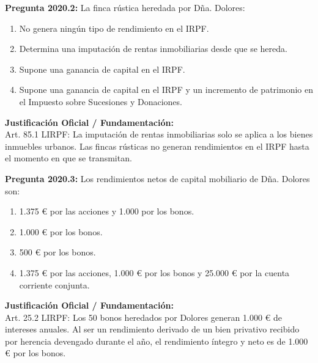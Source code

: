 \documentclass[11pt,a4paper,openany]{article}
\begin{document}
\noindent\textbf{\sffamily Pregunta 2020.2:} La finca rústica heredada por Dña. Dolores:\\[0.15cm]
\begin{enumerate}[label=\textbf{\alph*)},leftmargin=1.8em,itemsep=1.5pt,topsep=2pt,partopsep=0pt,parsep=0pt]
    \item No genera ningún tipo de rendimiento en el IRPF.
    \item Determina una imputación de rentas inmobiliarias desde que se hereda.
    \item Supone una ganancia de capital en el IRPF.
    \item Supone una ganancia de capital en el IRPF y un incremento de patrimonio en el Impuesto sobre Sucesiones y Donaciones.
\end{enumerate}
\begin{solucionBox}
\textbf{Justificación Oficial / Fundamentación:}\\[0.1cm]
Art. 85.1 LIRPF: La imputación de rentas inmobiliarias solo se aplica a los bienes inmuebles urbanos. Las fincas rústicas no generan rendimientos en el IRPF hasta el momento en que se transmitan.
\end{solucionBox}
\vspace{0.35cm}

\noindent\textbf{\sffamily Pregunta 2020.3:} Los rendimientos netos de capital mobiliario de Dña. Dolores son:\\[0.15cm]
\begin{enumerate}[label=\textbf{\alph*)},leftmargin=1.8em,itemsep=1.5pt,topsep=2pt,partopsep=0pt,parsep=0pt]
    \item 1.375 \euro{} por las acciones y 1.000 por los bonos.
    \item 1.000 \euro{} por los bonos.
    \item 500 \euro{} por los bonos.
    \item 1.375 \euro{} por las acciones, 1.000 \euro{} por los bonos y 25.000 \euro{} por la cuenta corriente conjunta.
\end{enumerate}
\begin{solucionBox}
\textbf{Justificación Oficial / Fundamentación:}\\[0.1cm]
Art. 25.2 LIRPF: Los 50 bonos heredados por Dolores generan 1.000 \euro{} de intereses anuales. Al ser un rendimiento derivado de un bien privativo recibido por herencia devengado durante el año, el rendimiento íntegro y neto es de 1.000 \euro{} por los bonos.
\end{solucionBox}
\vspace{0.35cm}
\end{document}
